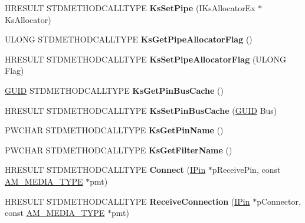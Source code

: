 \begin{DoxyCompactItemize}
H\+R\+E\+S\+U\+LT S\+T\+D\+M\+E\+T\+H\+O\+D\+C\+A\+L\+L\+T\+Y\+PE {\bfseries Ks\+Set\+Pipe} (I\+Ks\+Allocator\+Ex $\ast$Ks\+Allocator)
\item 
\mbox{\label{class_c_output_pin_a8eeb11a1f8799c4f879f678e9af0bf19}} 
U\+L\+O\+NG S\+T\+D\+M\+E\+T\+H\+O\+D\+C\+A\+L\+L\+T\+Y\+PE {\bfseries Ks\+Get\+Pipe\+Allocator\+Flag} ()
\item 
\mbox{\label{class_c_output_pin_ab2e5b053ff20fe286b7675600efe1947}} 
H\+R\+E\+S\+U\+LT S\+T\+D\+M\+E\+T\+H\+O\+D\+C\+A\+L\+L\+T\+Y\+PE {\bfseries Ks\+Set\+Pipe\+Allocator\+Flag} (U\+L\+O\+NG Flag)
\item 
\mbox{\label{class_c_output_pin_affc27e71cf8b2ec9f076a984267d7f32}} 
\hyperlink{interface_g_u_i_d}{G\+U\+ID} S\+T\+D\+M\+E\+T\+H\+O\+D\+C\+A\+L\+L\+T\+Y\+PE {\bfseries Ks\+Get\+Pin\+Bus\+Cache} ()
\item 
\mbox{\label{class_c_output_pin_a1398c0513a4b80f0de1106d9bb8d03b8}} 
H\+R\+E\+S\+U\+LT S\+T\+D\+M\+E\+T\+H\+O\+D\+C\+A\+L\+L\+T\+Y\+PE {\bfseries Ks\+Set\+Pin\+Bus\+Cache} (\hyperlink{interface_g_u_i_d}{G\+U\+ID} Bus)
\item 
\mbox{\label{class_c_output_pin_a0e7658f7cbeb956e0d65e8ebe269d0c9}} 
P\+W\+C\+H\+AR S\+T\+D\+M\+E\+T\+H\+O\+D\+C\+A\+L\+L\+T\+Y\+PE {\bfseries Ks\+Get\+Pin\+Name} ()
\item 
\mbox{\label{class_c_output_pin_a3b3a55730da31d8a98ca1bb27caee048}} 
P\+W\+C\+H\+AR S\+T\+D\+M\+E\+T\+H\+O\+D\+C\+A\+L\+L\+T\+Y\+PE {\bfseries Ks\+Get\+Filter\+Name} ()
\item 
\mbox{\label{class_c_output_pin_a4f8db06677c769b6ca283b1bd1821bc6}} 
H\+R\+E\+S\+U\+LT S\+T\+D\+M\+E\+T\+H\+O\+D\+C\+A\+L\+L\+T\+Y\+PE {\bfseries Connect} (\hyperlink{interface_i_pin}{I\+Pin} $\ast$p\+Receive\+Pin, const \hyperlink{struct_a_m___m_e_d_i_a___t_y_p_e}{A\+M\+\_\+\+M\+E\+D\+I\+A\+\_\+\+T\+Y\+PE} $\ast$pmt)
\item 
\mbox{\label{class_c_output_pin_af605fb1ac44ef980803b4e6ebbfd1cac}} 
H\+R\+E\+S\+U\+LT S\+T\+D\+M\+E\+T\+H\+O\+D\+C\+A\+L\+L\+T\+Y\+PE {\bfseries Receive\+Connection} (\hyperlink{interface_i_pin}{I\+Pin} $\ast$p\+Connector, const \hyperlink{struct_a_m___m_e_d_i_a___t_y_p_e}{A\+M\+\_\+\+M\+E\+D\+I\+A\+\_\+\+T\+Y\+PE} $\ast$pmt)

\end{DoxyCompactItemize}
